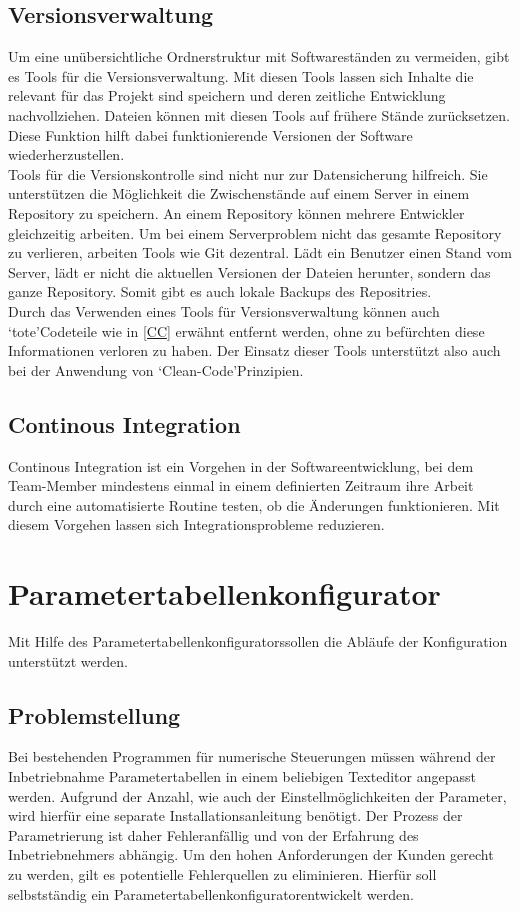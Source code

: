 \documentclass[12pt,a4paper]{article}
\begin{document}
\subsection{Versionsverwaltung}
\label{Git}
Um eine unübersichtliche Ordnerstruktur mit Softwareständen zu vermeiden, gibt es Tools für die Versionsverwaltung. Mit diesen Tools lassen sich Inhalte die relevant für das Projekt sind speichern und deren zeitliche Entwicklung nachvollziehen. Dateien können mit diesen Tools auf frühere Stände zurücksetzen. Diese Funktion hilft dabei funktionierende Versionen der Software wiederherzustellen.\\
Tools für die Versionskontrolle sind nicht nur zur Datensicherung hilfreich. Sie unterstützen die Möglichkeit die Zwischenstände auf einem Server in einem Repository zu speichern. An einem Repository können mehrere Entwickler gleichzeitig arbeiten. Um bei einem Serverproblem nicht das gesamte Repository zu verlieren, arbeiten Tools wie Git dezentral. Lädt ein Benutzer einen Stand vom Server, lädt er nicht die aktuellen Versionen der Dateien herunter, sondern das ganze Repository. Somit gibt es auch lokale Backups des Repositries\cite{denker2015versionsverwaltung}.\\
Durch das Verwenden eines Tools für Versionsverwaltung können auch \lq tote\rq\space Codeteile wie in \ref{CC} erwähnt entfernt werden, ohne zu befürchten diese Informationen verloren zu haben. Der Einsatz dieser Tools unterstützt also auch bei der Anwendung von \lq Clean-Code\rq\space Prinzipien.
\subsection{Continous Integration}
\label{CI}
Continous Integration ist ein Vorgehen in der Softwareentwicklung, bei dem Team-Member mindestens einmal in einem definierten Zeitraum ihre Arbeit durch eine automatisierte Routine testen, ob die Änderungen funktionieren. Mit diesem Vorgehen lassen sich Integrationsprobleme reduzieren\cite{fowler2006continuous}.
\section{Parametertabellenkonfigurator}
Mit Hilfe des \glqq Parametertabellenkonfigurators\grqq\space sollen die Abläufe der Konfiguration unterstützt werden.
\subsection{Problemstellung}
Bei bestehenden Programmen für numerische Steuerungen müssen während der Inbetriebnahme Parametertabellen in einem beliebigen Texteditor angepasst werden. Aufgrund der Anzahl, wie auch der Einstellmöglichkeiten der Parameter, wird hierfür eine separate Installationsanleitung benötigt. Der Prozess der Parametrierung ist daher Fehleranfällig und von der Erfahrung des Inbetriebnehmers abhängig. Um den hohen Anforderungen der Kunden gerecht zu werden, gilt es potentielle Fehlerquellen zu eliminieren. Hierfür soll selbstständig ein \glqq Parametertabellenkonfigurator\grqq\space entwickelt werden.
\end{document}
